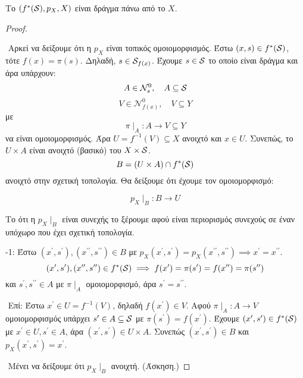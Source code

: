 \begin{prop} Το $(f^*(\mathcal{S}),p_X, X)$ είναι δράγμα πάνω από το $X$.
\end{prop}

\begin{proof}$ $

    $ $\newline
    Αρκεί να δείξουμε ότι η $p_X$ είναι τοπικός ομοιομορφισμός. Έστω $(x,s) \in f^*(\mathcal{S})$, τότε $f(x) = \pi(s)$. Δηλαδή, $s \in \mathcal{S}_{f(x)}$. Έχουμε $s \in \mathcal{S}$ το οποίο είναι δράγμα και άρα υπάρχουν:
    $$A \in \mathcal{N}^0_s, \quad A \subseteq \mathcal{S} $$
    $$V \in \mathcal{N}^0_{f(x)}, \quad V \subseteq Y$$ με 
    $$\pi \mid_A : A \longrightarrow V \subseteq Y$$ να είναι ομοιομορφισμός. Άρα $U = f^{-1}(V) \subseteq X$ ανοιχτό και $x \in U$. Συνεπώς, το $U\times A$ είναι ανοιχτό (βασικό) του $X \times \mathcal{S}$.
    $$B = (U\times A) \cap f^*(\mathcal{S})$$ ανοιχτό στην σχετική τοπολογία. Θα δείξουμε ότι έχουμε τον ομοιομορφισμό:

    $$p_X \mid_B : B \longrightarrow U$$

    \noindent Το ότι η $p_X\mid_B$ είναι συνεχής το ξέρουμε αφού είναι περιορισμός συνεχούς σε έναν υπόχωρο που έχει σχετική τοπολογία.

    $ $-1: Έστω $(x^{\prime},s^{\prime}), (x^{\prime\prime},s^{\prime\prime}) \in B$ με $p_X (x^{\prime},s^{\prime}) = p_X (x^{\prime\prime},s^{\prime\prime}) \implies x^{\prime} = x^{\prime\prime}$.
    $$(x^{\prime},s^{\prime}), (x^{\prime\prime},s^{\prime\prime}) \in f^*(\mathcal{S}) \implies f(x^{\prime}) = \pi(s^{\prime}) = f(x^{\prime\prime}) = \pi(s^{\prime\prime})$$ και $s^{\prime},s^{\prime\prime} \in A$ με $\pi\mid_A$ ομοιομορφισμό, άρα $s^{\prime} = s^{\prime\prime}$.

    $ $\newline
    Επί: Έστω $x^{\prime} \in U=f^{-1}(V)$, δηλαδή $f(x^{\prime}) \in V$. Αφού $\pi\mid_A:A\rightarrow V$ ομοιομορφισμός υπάρχει $s^{\prime} \in A \subseteq \mathcal{S}$ με $\pi(s^{\prime}) = f(x^{\prime})$. Έχουμε $(x^{\prime},s^{\prime}) \in f^*(\mathcal{S})$ με $x^{\prime} \in U, s^{\prime} \in A$, άρα $(x^{\prime},s^{\prime}) \in U \times A$. Συνεπώς $(x^{\prime},s^{\prime}) \in B$ και $p_X(x^{\prime},s^{\prime}) = x^{\prime}$.
    
    $ $\newline
    Μένει να δείξουμε ότι $p_X\mid_B$ ανοιχτή. (Άσκηση.)
\end{proof}
\vspace*{0.3cm}

